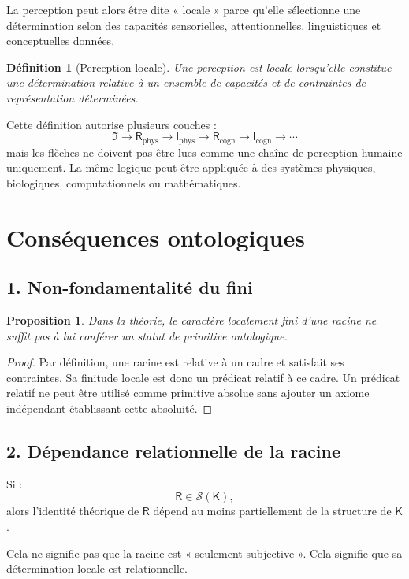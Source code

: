 \documentclass[11pt,a4paper]{article}
\newtheorem{definition}{Définition}[section]
\newtheorem{proposition}{Proposition}[section]
\newcommand{\Rac}{\mathsf{R}}
\newcommand{\Inrac}{\mathsf{I}}
\newcommand{\Cadre}{\mathsf{K}}
\newcommand{\Sol}{\mathcal{S}}
\begin{document}
La perception peut alors être dite « locale » parce qu'elle sélectionne une
détermination selon des capacités sensorielles, attentionnelles,
linguistiques et conceptuelles données.

\begin{definition}[Perception locale]
Une perception est locale lorsqu'elle constitue une détermination relative à
un ensemble de capacités et de contraintes de représentation déterminées.
\end{definition}

Cette définition autorise plusieurs couches :
\[
\mathfrak I
\to
\Rac_{\mathrm{phys}}
\to
\Inrac_{\mathrm{phys}}
\to
\Rac_{\mathrm{cogn}}
\to
\Inrac_{\mathrm{cogn}}
\to\cdots
\]
mais les flèches ne doivent pas être lues comme une chaîne de perception
humaine uniquement. La même logique peut être appliquée à des systèmes
physiques, biologiques, computationnels ou mathématiques.

\section{Conséquences ontologiques}

\subsection{1. Non-fondamentalité du fini}

\begin{proposition}
Dans la théorie, le caractère localement fini d'une racine ne suffit pas à lui
conférer un statut de primitive ontologique.
\end{proposition}

\begin{proof}
Par définition, une racine est relative à un cadre et satisfait ses contraintes.
Sa finitude locale est donc un prédicat relatif à ce cadre. Un prédicat relatif
ne peut être utilisé comme primitive absolue sans ajouter un axiome indépendant
établissant cette absoluité.
\end{proof}

\subsection{2. Dépendance relationnelle de la racine}

Si :
\[
\Rac\in\Sol(\Cadre),
\]
alors l'identité théorique de \(\Rac\) dépend au moins partiellement de la
structure de \(\Cadre\).

Cela ne signifie pas que la racine est « seulement subjective ». Cela signifie
que sa détermination locale est relationnelle.
\end{document}
